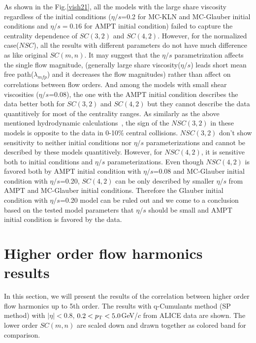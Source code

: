 As shown in the Fig.\ref{vish21},  all the models with the large share viscosity regardless of the initial conditions ($\eta/s$=0.2 for MC-KLN and MC-Glauber initial conditions and $\eta/s = 0.16$ for AMPT initial condition) failed to capture the centrality dependence of $SC(3,2)$ and $SC(4,2)$.  However, for the normalized case($NSC$), all the results with different parameters do not have much difference as like original $SC(m,n)$. It may suggest that the $\eta/s$ parametrization affects the single flow magnitude, (generally large share viscosity($\eta/s$) leads short mean free path($\lambda_{mfp}$) and it decreases the flow magnitudes) rather than affect on correlations between flow orders. 
And among the models with small shear viscosities ($\eta/s$=0.08), the one with the AMPT initial condition describes the data better both for $SC(3,2)$ and $SC(4,2)$ but they cannot describe the data quantitively for most of the centrality ranges.
As similarly as the above mentioned hydrodynamic calculations~\cite{Niemi:2015qia}, the sign of the $NSC(3,2)$ in these models is opposite to the data in 0-10\% central collisions. $NSC(3,2)$ don't show sensitivity to neither initial conditions nor $\eta/s$ parameterizations and cannot be described by these models quantitively.
However, for $NSC(4,2)$, it is sensitive both to initial conditions and $\eta/s$ parameterizations.
Even though $NSC(4,2)$ is favored both by AMPT initial condition with $\eta/s$=0.08 and MC-Glauber initial condition with $\eta/s$=0.20,
$SC(4,2)$ can be only described by smaller $\eta/s$ from AMPT and MC-Glauber initial conditions. Therefore the Glauber initial condition with $\eta/s$=0.20 model can be ruled out and we come to a conclusion based on the tested model parameters that $\eta/s$ should be small and AMPT initial condition is favored by the data.
  

\section{Higher order flow harmonics results}

In this section, we will present the results of the correlation between higher order flow harmonics up to 5th order. The results with q-Cumulants method (SP method) with $|\eta| < 0.8$, $0.2 < p_{\rm{T}} < 5.0$GeV/$c$ from ALICE data are shown. The lower order $SC(m,n)$ are scaled down and drawn together as colored band for comparison.


